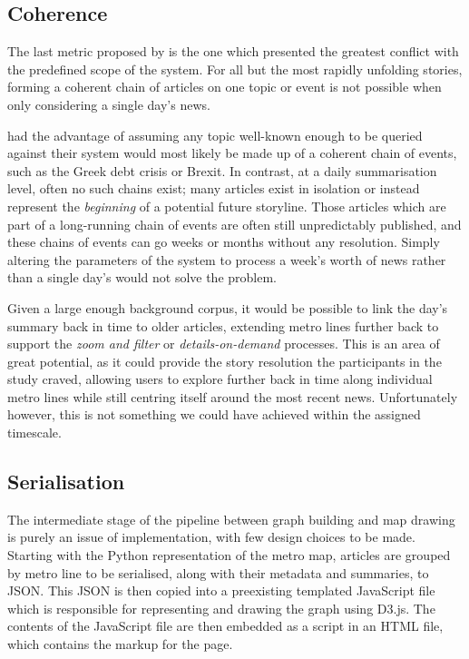 \subsection{Coherence}
The last metric proposed by \citeauthor{GeneratingInformationMaps} is the one which presented the greatest conflict with the predefined scope of the system. For all but the most rapidly unfolding stories, forming a coherent chain of articles on one topic or event is not possible when only considering a single day's news.

\citeauthor{GeneratingInformationMaps} had the advantage of assuming any topic well-known enough to be queried against their system would most likely be made up of a coherent chain of events, such as the Greek debt crisis or Brexit. In contrast, at a daily summarisation level, often no such chains exist; many articles exist in isolation or instead represent the \textit{beginning} of a potential future storyline. Those articles which are part of a long-running chain of events are often still unpredictably published, and these chains of events can go weeks or months without any resolution. Simply altering the parameters of the system to process a week's worth of news rather than a single day's would not solve the problem.

Given a large enough background corpus, it would be possible to link the day's summary back in time to older articles, extending metro lines further back to support the \textit{zoom and filter} or \textit{details-on-demand} processes. This is an area of great potential, as it could provide the story resolution the participants in the \cite{anewmodelfornews} study craved, allowing users to explore further back in time along individual metro lines while still centring itself around the most recent news. Unfortunately however, this is not something we could have achieved within the assigned timescale. 


\subsection{Serialisation}
The intermediate stage of the pipeline between graph building and map drawing is purely an issue of implementation, with few design choices to be made. Starting with the Python representation of the metro map, articles are grouped by metro line to be serialised, along with their metadata and summaries, to JSON. This JSON is then copied into a preexisting templated JavaScript file which is responsible for representing and drawing the graph using D3.js. The contents of the JavaScript file are then embedded as a script in an HTML file, which contains the markup for the page. 

